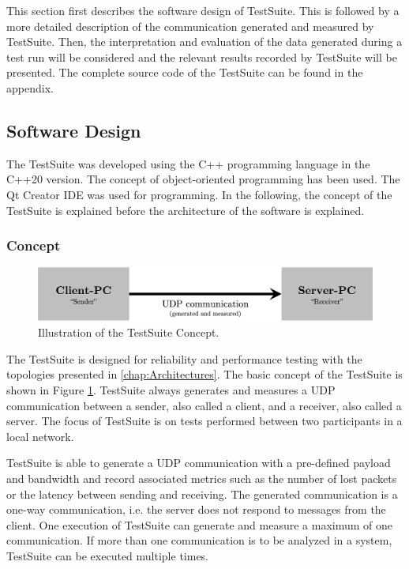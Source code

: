 This section first describes the software design of TestSuite. This is followed by a more detailed description of the communication generated and measured by TestSuite. Then, the interpretation and evaluation of the data generated during a test run will be considered and the relevant results recorded by TestSuite will be presented. The complete source code of the TestSuite can be found in the appendix.


\subsection{Software Design}
The TestSuite was developed using the C++ programming language in the C++20 version. The concept of object-oriented programming has been used. The Qt Creator IDE was used for programming. In the following, the concept of the TestSuite is explained before the architecture of the software is explained.

\subsubsection{Concept}

\begin{figure}[h!]
    \centering
    \includegraphics[width=1\linewidth]{figures/method/swdesign1.png}
    \caption[Illustration of the TestSuite Concept]{Illustration of the TestSuite Concept.}
    \label{fig:tsconcept}
\end{figure}

The TestSuite is designed for reliability and performance testing with the topologies presented in \ref{chap:Architectures}. The basic concept of the TestSuite is shown in Figure \ref{fig:tsconcept}. TestSuite always generates and measures a UDP communication between a sender, also called a client, and a receiver, also called a server. The focus of TestSuite is on tests performed between two participants in a local network.

TestSuite is able to generate a UDP communication with a pre-defined payload and bandwidth and record associated metrics such as the number of lost packets or the latency between sending and receiving. The generated communication is a one-way communication, i.e. the server does not respond to messages from the client. One execution of TestSuite can generate and measure a maximum of one communication. If more than one communication is to be analyzed in a system, TestSuite can be executed multiple times.

